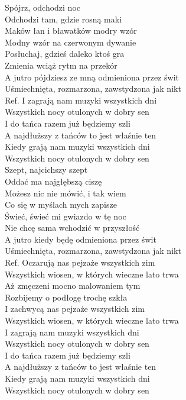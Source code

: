 
Spójrz, odchodzi noc  \tab{} \tab{}  \\
Odchodzi tam, gdzie rosną maki  \tab{}   \\
Maków łan i bławatków modry wzór  \tab{}  \\
Modny wzór na czerwonym dywanie  \tab{}  \\
Posłuchaj, gdzieś daleko ktoś gra  \tab{}  \\
Zmienia wciąż rytm na przekór  \tab{}  \\
A jutro pójdziesz ze mną odmieniona przez świt    \\
Uśmiechnięta, rozmarzona, zawstydzona jak nikt   \\
\hops
Ref. I zagrają nam muzyki wszystkich dni  \tab{}   \\
 Wszystkich nocy otulonych w dobry sen  \tab{}   \\
 I do tańca razem już będziemy szli  \tab{}  \\
 A najdłuższy z tańców to jest właśnie ten   \\
 Kiedy grają nam muzyki wszystkich dni  \tab{}  \\
 Wszystkich nocy otulonych w dobry sen  \tab{} \\
\hops
Szept, najcichszy szept \\
Oddać ma najgłębszą ciszę \\
Możesz nic nie mówić, i tak wiem \\
Co się w myślach mych zapisze \\
Świeć, świeć mi gwiazdo w tę noc \\
Nie chcę sama wchodzić w przyszłość \\
A jutro kiedy będę odmieniona przez świt \\
Uśmiechnięta, rozmarzona, zawstydzona jak nikt \\
\hops
Ref. Oczarują nas pejzaże wszystkich zim \\
 Wszystkich wiosen, w których wieczne lato trwa \\
 Aż zmęczeni mocno malowaniem tym \\
 Rozbijemy o podłogę trochę szkła \\
 I zachwycą nas pejzaże wszystkich zim \\
 Wszystkich wiosen, w których wieczne lato trwa \\
 I zagrają nam muzyki wszystkich dni  \\
 Wszystkich nocy otulonych w dobry sen  \\
 I do tańca razem już będziemy szli  \\
 A najdłuższy z tańców to jest właśnie ten  \\
 Kiedy grają nam muzyki wszystkich dni  \\
 Wszystkich nocy otulonych w dobry sen

